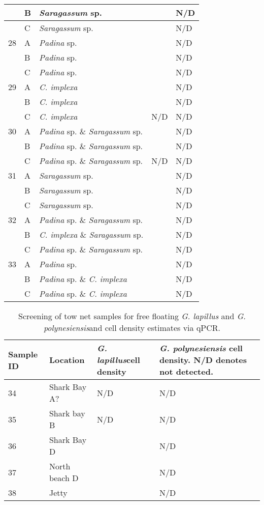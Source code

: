 \documentclass[12pt]{article}
\begin{document}
\begin{longtable}{ | p{1cm} | p{1cm} | p{3cm} | p{4cm} | p{4cm} | }
\hline
&B&\emph{Saragassum} sp.&&N/D\\
\hline
&C&\emph{Saragassum} sp.&&N/D\\
\hline
28&A&\emph{Padina} sp.&&N/D\\
\hline
&B&\emph{Padina} sp.&&N/D\\
\hline
&C&\emph{Padina} sp.&&N/D\\
\hline
29&A&\emph{C. implexa}&&N/D\\
\hline
&B&\emph{C. implexa}&&N/D\\
\hline
&C&\emph{C. implexa}&N/D&N/D\\
\hline
30&A&\emph{Padina} sp. \& \emph{Saragassum} sp.&&N/D\\
\hline
&B&\emph{Padina} sp. \& \emph{Saragassum} sp.&&N/D\\
\hline
&C&\emph{Padina} sp. \& \emph{Saragassum} sp.&N/D&N/D\\
\hline
31&A&\emph{Saragassum} sp.&&N/D\\
\hline
&B&\emph{Saragassum} sp.&&N/D\\
\hline
&C&\emph{Saragassum} sp.&&N/D\\
\hline
32&A&\emph{Padina} sp. \& \emph{Saragassum} sp.&&N/D\\
\hline
&B&\emph{C. implexa} \& \emph{Saragassum} sp.&&N/D\\
\hline
&C&\emph{Padina} sp. \& \emph{Saragassum} sp.&&N/D\\
\hline
33&A&\emph{Padina} sp.&&N/D\\
\hline
&B&\emph{Padina} sp. \& \emph{C. implexa}&&N/D\\
\hline
&C&\emph{Padina} sp. \& \emph{C. implexa}&&N/D\\
\hline
\end{longtable}
\FloatBarrier
\FloatBarrier
\begin{table}
\caption{Screening of tow net samples for free floating \emph{G. lapillus} and \emph{G. polynesiensis}and cell density estimates via qPCR.}
\label{tbl:NetTable}
\begin{tabular}{ | p{4cm} | p{4cm} |p{4cm} | p{4cm} | }
\hline
\textbf{Sample ID}&\textbf{Location}&\textbf{\emph{G. lapillus}cell density}&\textbf{\emph{G. polynesiensis} cell density. N/D denotes not detected.}\\
\hline
34&Shark Bay A?&N/D&N/D\\
\hline
35&Shark bay B&N/D&N/D\\
\hline
36&Shark Bay D&&N/D\\
\hline
37&North beach D&&N/D\\
\hline
38&Jetty&&N/D\\
\hline
\end{tabular}
\end{table}
\FloatBarrier
\newpage
\end{document}
